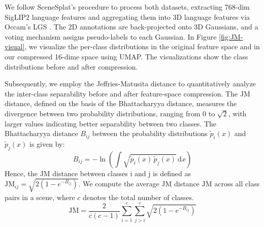 We follow SceneSplat's procedure to process both datasets, extracting 768-dim SigLIP2 \cite{tschannen2025siglip} language features and aggregating them into 3D language features via Occam's LGS \cite{cheng2024occamslgssimpleapproach}. The 2D annotations are back-projected onto 3D Gaussians, and a voting mechanism assigns pseudo-labels to each Gaussian. In Figure \ref{fig:JM-visual}, we visualize the per-class distributions in the original feature space and in our compressed 16-dime space using UMAP.
The visualizations show the class distributions before and after compression.

Subsequently, we employ the Jeffries-Matusita distance to quantitatively analyze the inter-class separability before and after feature-space compression. The JM distance, defined on the basis of the Bhattacharyya distance, measures the divergence between two probability distributions, ranging from 0 to $\sqrt{2}$, with larger values indicating better separability between two classes. The Bhattacharyya distance $B_{ij}$ between the probability distributions $\tilde{p}_i(x)$ and $\tilde{p}_j(x)$ is given by:
\begin{equation}
    B_{ij} = -\ln \left( \int \sqrt{\tilde{p}_i(x) \, \tilde{p}_j(x)} \, \mathrm{d}x \right)
\end{equation}
Hence, the JM distance between classes i and j is defined as $\text{JM}_{ij} = \sqrt{2(1 - e^{-B_{ij}})}$. We compute the average JM distance $\overline{\text{JM}}$ across all class pairs in a scene, where $c$ denotes the total number of classes.
\begin{equation}
    \overline{\text{JM}} = \frac{2}{c(c-1)} \sum_{i=1}^{c} \sum_{j>i}^{c} \sqrt{2(1 - e^{-B_{ij}})}
\end{equation}

